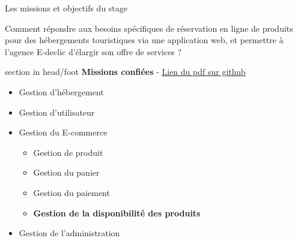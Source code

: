 \documentclass{beamer}
\begin{document}
\begin{frame}{Les missions et objectifs du stage}

	Comment répondre aux besoins spécifiques de réservation en ligne de produits pour des hébergements touristiques via une application web, et permettre à l’agence E-declic d’élargir son offre de services ?
			
	\begin{center}
  		\begin{minipage}{0.9\textwidth}
			\begin{beamercolorbox}[wd=\paperwidth,ht=1.5em,dp=0.5em,leftskip=0.5cm]{section in head/foot}
  				\large \textbf{Missions confiées} - \href{https://github.com/Matteo-K/Soutenance_E-delic/blob/main/pdf/cc-painspizzas-camping.pdf}{\underline{\normalsize Lien du pdf sur github}}
			\end{beamercolorbox}
			\begin{itemize}
				\item<1-> Gestion d'hébergement
				\item<2-> Gestion d'utilisateur
				\item<3-> Gestion du E-commerce
				\begin{itemize}
					\item Gestion de produit
					\item Gestion du panier
					\item Gestion du paiement
					\item \textbf{Gestion de la disponibilité des produits}
				\end{itemize}
				\item<4-> Gestion de l'administration
			\end{itemize}
  		\end{minipage}
  		\vspace{1cm}
	\end{center}
	\vfill
\end{frame}
\end{document}
